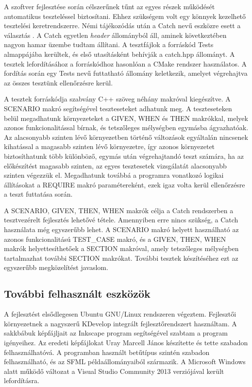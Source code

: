 \documentclass[12pt, twoside]{report}
\begin{document}
A szoftver fejlesztése során célszerűnek tűnt az egyes részek működését automatikus teszteléssel biztosítani. Ehhez szükségem volt egy könnyek kezelhető tesztelési keretrendszerre. Némi tájékozódás után a Catch nevű eszközre esett a választás \cite{catch}. A Catch egyetlen \emph{header} állományból áll, aminek következtében nagyon hamar üzembe tudtam állítani. A tesztfájlok a forráskód Tests almappájába kerültek, és első utasításként behívják a catch.hpp állományt. A tesztek lefordításához a forráskódhoz hasonlóan a CMake rendszer használatos. A fordítás során egy Tests nevű futtatható állomány keletkezik, amelyet végrehajtva az összes tesztünk ellenőrzésre kerül.

A tesztek forráskódja szabvány C++ szöveg néhány makróval kiegészítve. A \break SCENARIO makró segítségével teszteseteket adhatunk meg. A teszteseteken belül megadhatunk környezeteket a GIVEN, WHEN és THEN makrókkal, melyek azonos funkcionalitással bírnak, és tetszőleges mélységben egymásba ágyazhatóak. Az alacsonyabb szinten lévő környezetben történő változások egyáltalán nincsenek kihatással a magasabb szinten lévő környezetre, így azonos környezetet biztosíthatunk több különböző, egymás után végrehajtandó teszt számára, ha az előkészítést magasabb szinten, az egyes tesztesetek vizsgálatát alacsonyabb szinten végezzük el. Megadhatunk továbbá a programra vonatkozó logikai állításokat a REQUIRE makró paramétereként, ezek igaz volta kerül ellenőrzésre a teszt futtatása során.

A SCENARIO, GIVEN, THEN, WHEN makrók célja a Catch rendszerben a tesztvezérelt fejlesztés lehetővé tétele. Amennyiben erre nincs szükség, a Catch használata még egyszerűbb lehet. A SCENARIO makró helyett használható az azonos funkcionalitású TEST\_CASE makró, és a GIVEN, THEN, WHEN makrók helyettesíthetőek a SECTION makróval, amely tetszőleges mélységben tartalmazhat további SECTION makrókat. További tesztek készítéséhez ezt az egyszerűbb megközelítést javaslom.

\subsection{További felhasznált eszközök}

A fejlesztést elsődlegesen Ubuntu GNU/Linux rendszeren végeztem. Fejlesztői környezetnek a nagyszerű KDevelop integrált fejlesztőrendszert használtam. A sakkbábuk képfájljait az Inkscape program segítségével szabtam a program igényeihez. Az eredeti képfájlokat Uray Marcell János készítette és tette szabadon felhasználhatóvá. A programban használt betűtípus szintén szabadon felhasználható, és az SFML példaállományaiból származik. A Microsoft Windows alatt működő változat a Visual Studio Community 2013 verziójával került lefordításra.
\end{document}
